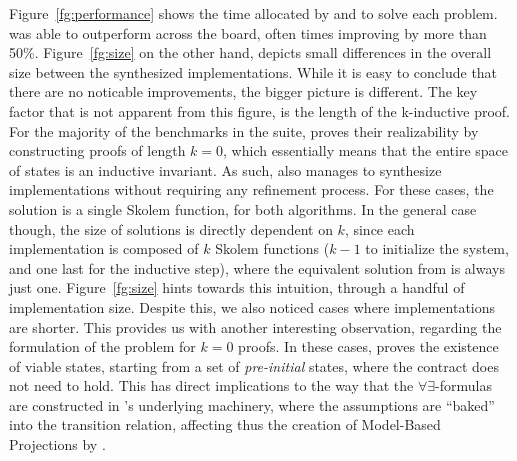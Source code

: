 Figure~\ref{fg:performance} shows the time allocated by \jsyn and \jsynvg to
solve each problem. \jsynvg was able to outperform \jsyn across the board, often
times improving by more than 50\%. Figure~\ref{fg:size} on the other hand,
depicts small differences in the overall size between the synthesized
implementations. While it is easy to conclude that there are no
noticable improvements, the bigger picture is different. The key
factor that is not apparent from this figure, is the length of the k-inductive
proof. For the majority of the benchmarks in the suite, \jsyn proves their
realizability by constructing proofs of length $k=0$, which essentially means
that the entire space of states is an inductive invariant. As such, \jsynvg
also manages to synthesize implementations without requiring any refinement
process. For these cases, the solution is a single Skolem function, for both
algorithms. In the general case though, the size of \jsyn solutions is directly
dependent on $k$, since each implementation is composed of $k$ Skolem
functions ($k-1$ to initialize the system, and one last for the inductive step),
where the equivalent solution from \jsynvg is always just one.
Figure~\ref{fg:size} hints towards this intuition, through a handful of \jsyn
implementation size. Despite this, we also noticed cases where \jsyn
implementations are shorter. This provides us with another interesting
observation, regarding the formulation of the problem for $k=0$ proofs. In
these cases, \jsyn proves the existence of viable states, starting from a set
of \textit{pre-initial} states, where the contract does not need to hold. This
has direct implications to the way that the $\forall\exists$-formulas are
constructed in \jsyn's underlying machinery, where the assumptions are ``baked''
into the transition relation, affecting thus the creation of Model-Based
Projections by \aeval.

